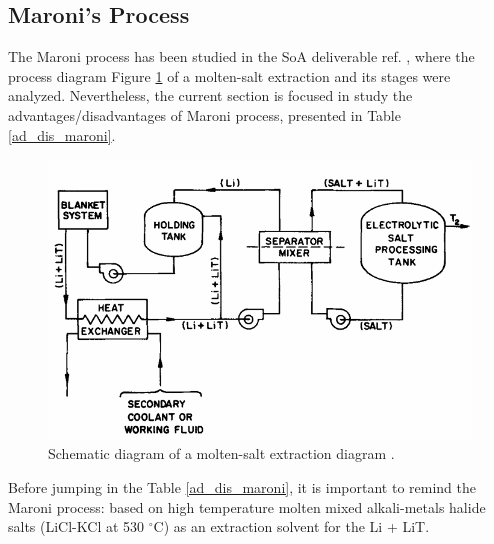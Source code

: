 \newpage
\subsection{Maroni's Process}

The Maroni process has been studied in the SoA deliverable ref. \cite{SoA}, where the process diagram Figure \ref{maroni} of a molten-salt extraction and its stages were analyzed. Nevertheless, the current section is focused in study the advantages/disadvantages of Maroni process, presented in Table \ref{ad_dis_maroni}.  

\begin{figure}[H]
	\centering
	\includegraphics[width=0.7\linewidth]{maroni_schema.png}
	\captionsetup{font=bf, size=small}
	\caption{Schematic diagram of a molten-salt extraction diagram \cite{Maroni1975}.}
	\label{maroni}
\end{figure}

\noindent Before jumping in the Table \ref{ad_dis_maroni}, it is important to remind the Maroni process: based on high temperature molten mixed alkali-metals halide salts (LiCl-KCl at 530 $^\circ$C) as an extraction solvent for the Li + LiT.


